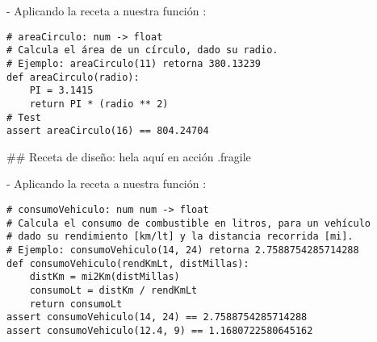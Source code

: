 - Aplicando la receta a nuestra función :

\begin{lstlisting}[linewidth=.8\textwidth,xleftmargin=.1\textwidth]
# areaCirculo: num -> float
# Calcula el área de un círculo, dado su radio.
# Ejemplo: areaCirculo(11) retorna 380.13239
def areaCirculo(radio):
    PI = 3.1415
    return PI * (radio ** 2)
# Test
assert areaCirculo(16) == 804.24704
\end{lstlisting}

## Receta de diseño: hela aquí en acción {.fragile}


- Aplicando la receta a nuestra función :

\begin{lstlisting}
# consumoVehiculo: num num -> float
# Calcula el consumo de combustible en litros, para un vehículo
# dado su rendimiento [km/lt] y la distancia recorrida [mi].
# Ejemplo: consumoVehiculo(14, 24) retorna 2.7588754285714288
def consumoVehiculo(rendKmLt, distMillas):
    distKm = mi2Km(distMillas)
    consumoLt = distKm / rendKmLt
    return consumoLt
assert consumoVehiculo(14, 24) == 2.7588754285714288
assert consumoVehiculo(12.4, 9) == 1.1680722580645162
\end{lstlisting}

